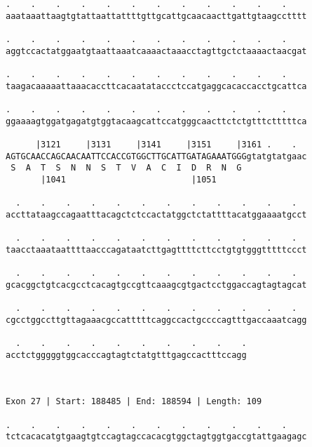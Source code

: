 \documentclass{article}
\begin{document}
\begin{Verbatim}
.    .    .    .    .    .    .    .    .    .    .    .    
aaataaattaagtgtattaattattttgttgcattgcaacaacttgattgtaagcctttt
                                                            
.    .    .    .    .    .    .    .    .    .    .    .    
aggtccactatggaatgtaattaaatcaaaactaaacctagttgctctaaaactaacgat
                                                            
.    .    .    .    .    .    .    .    .    .    .    .    
taagacaaaaattaaacaccttcacaatataccctccatgaggcacaccacctgcattca
                                                            
.    .    .    .    .    .    .    .    .    .    .    .    
ggaaaagtggatgagatgtggtacaagcattccatgggcaacttctctgtttctttttca
                                                            
      |3121     |3131     |3141     |3151     |3161 .    .  
AGTGCAACCAGCAACAATTCCACCGTGGCTTGCATTGATAGAAATGGGgtatgtatgaac
 S  A  T  S  N  N  S  T  V  A  C  I  D  R  N  G             
       |1041                         |1051                  
  
  .    .    .    .    .    .    .    .    .    .    .    .  
accttataagccagaatttacagctctccactatggctctattttacatggaaaatgcct
                                                            
  .    .    .    .    .    .    .    .    .    .    .    .  
taacctaaataattttaacccagataatcttgagttttcttcctgtgtgggtttttccct
                                                            
  .    .    .    .    .    .    .    .    .    .    .    .  
gcacggctgtcacgcctcacagtgccgttcaaagcgtgactcctggaccagtagtagcat
                                                            
  .    .    .    .    .    .    .    .    .    .    .    .  
cgcctggccttgttagaaacgccatttttcaggccactgccccagtttgaccaaatcagg
                                                            
  .    .    .    .    .    .    .    .    .    .
acctctgggggtggcacccagtagtctatgtttgagccactttccagg
                                                
                                                
 
Exon 27 | Start: 188485 | End: 188594 | Length: 109
 
.    .    .    .    .    .    .    .    .    .    .    .    
tctcacacatgtgaagtgtccagtagccacacgtggctagtggtgaccgtattgaagagc
                                                            

\end{Verbatim}
\end{document}
